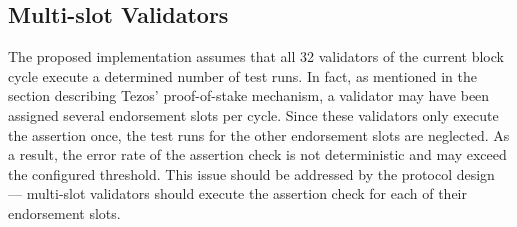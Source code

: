 \subsection{Multi-slot Validators}
The proposed implementation assumes that all 32 validators of the current block cycle execute a determined number of test runs. In fact, as mentioned in the section describing Tezos' proof-of-stake mechanism, a validator may have been assigned several endorsement slots per cycle. Since these validators only execute the assertion once, the test runs for the other endorsement slots are neglected. As a result, the error rate of the assertion check is not deterministic and may exceed the configured threshold. This issue should be addressed by the protocol design --- multi-slot validators should execute the assertion check for each of their endorsement slots.